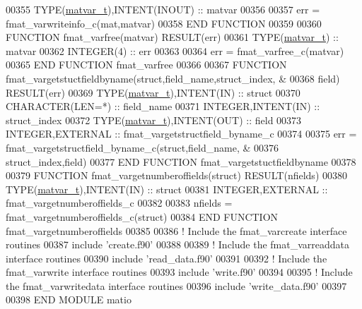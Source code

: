 \begin{DoxyCode}
00355         \textcolor{keywordtype}{TYPE}(\hyperlink{group___m_a_t_structmatvar__t}{matvar\_t}),\textcolor{keywordtype}{INTENT(INOUT)}        :: matvar
00356 
00357         err = fmat\_varwriteinfo\_c(mat,matvar)
00358 \textcolor{keyword}{    END FUNCTION}
00359 
00360 \textcolor{keyword}{    FUNCTION }fmat\_varfree(matvar) \textcolor{keyword}{RESULT}(err)
00361         \textcolor{keywordtype}{TYPE}(\hyperlink{group___m_a_t_structmatvar__t}{matvar\_t})         :: matvar
00362         \textcolor{keywordtype}{INTEGER(4)}             :: err
00363 
00364         err = fmat\_varfree\_c(matvar)
00365 \textcolor{keyword}{    END FUNCTION }fmat\_varfree
00366 
00367 \textcolor{keyword}{    FUNCTION }fmat\_vargetstuctfieldbyname(struct,field\_name,struct\_index,  &
00368                                          field) \textcolor{keyword}{RESULT}(err)
00369         \textcolor{keywordtype}{TYPE}(\hyperlink{group___m_a_t_structmatvar__t}{matvar\_t}),\textcolor{keywordtype}{INTENT(IN)}  :: struct
00370         \textcolor{keywordtype}{CHARACTER(LEN=*)}           :: field\_name
00371         \textcolor{keywordtype}{INTEGER},\textcolor{keywordtype}{INTENT(IN)}         :: struct\_index
00372         \textcolor{keywordtype}{TYPE}(\hyperlink{group___m_a_t_structmatvar__t}{matvar\_t}),\textcolor{keywordtype}{INTENT(OUT)} :: field
00373         \textcolor{keywordtype}{INTEGER},\textcolor{keywordtype}{EXTERNAL}           :: fmat\_vargetstructfield\_byname\_c
00374 
00375         err = fmat\_vargetstructfield\_byname\_c(struct,field\_name,          &
00376             struct\_index,field)
00377 \textcolor{keyword}{    END FUNCTION }fmat\_vargetstuctfieldbyname
00378 
00379 \textcolor{keyword}{    FUNCTION }fmat\_vargetnumberoffields(struct) \textcolor{keyword}{RESULT}(nfields)
00380         \textcolor{keywordtype}{TYPE}(\hyperlink{group___m_a_t_structmatvar__t}{matvar\_t}),\textcolor{keywordtype}{INTENT(IN)}  :: struct
00381         \textcolor{keywordtype}{INTEGER},\textcolor{keywordtype}{EXTERNAL}           :: fmat\_vargetnumberoffields\_c
00382 
00383         nfields = fmat\_vargetnumberoffields\_c(struct)
00384 \textcolor{keyword}{    END FUNCTION }fmat\_vargetnumberoffields
00385 
00386 \textcolor{comment}{!   Include the fmat\_varcreate interface routines}
00387     include \textcolor{stringliteral}{'create.f90'}
00388 
00389 \textcolor{comment}{!   Include the fmat\_varreaddata interface routines}
00390     include \textcolor{stringliteral}{'read\_data.f90'}
00391 
00392 \textcolor{comment}{!   Include the fmat\_varwrite interface routines}
00393     include \textcolor{stringliteral}{'write.f90'}
00394 
00395 \textcolor{comment}{!   Include the fmat\_varwritedata interface routines}
00396     include \textcolor{stringliteral}{'write\_data.f90'}
00397 
00398 \textcolor{keyword}{END MODULE }matio
\end{DoxyCode}
